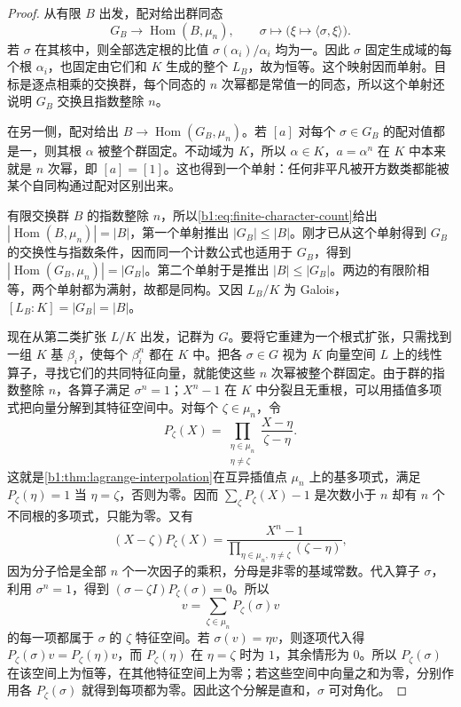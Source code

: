 \begin{proof}
	从有限 \(B\) 出发，配对给出群同态
	\[
		G_B\longrightarrow\operatorname{Hom}(B,\mu_n),\qquad \sigma\longmapsto\bigl(\xi\mapsto\langle\sigma,\xi\rangle\bigr).
	\]
	若 \(\sigma\) 在其核中，则全部选定根的比值 \(\sigma(\alpha_i)/\alpha_i\) 均为一。因此 \(\sigma\) 固定生成域的每个根 \(\alpha_i\)，也固定由它们和 \(K\) 生成的整个 \(L_B\)，故为恒等。这个映射因而单射。目标是逐点相乘的交换群，每个同态的 \(n\) 次幂都是常值一的同态，所以这个单射还说明 \(G_B\) 交换且指数整除 \(n\)。

	在另一侧，配对给出 \(B\rightarrow\operatorname{Hom}(G_B,\mu_n)\)。若 \([a]\) 对每个 \(\sigma\in G_B\) 的配对值都是一，则其根 \(\alpha\) 被整个群固定。不动域为 \(K\)，所以 \(\alpha\in K\)，\(a=\alpha^n\) 在 \(K\) 中本来就是 \(n\) 次幂，即 \([a]=[1]\)。这也得到一个单射：任何非平凡被开方数类都能被某个自同构通过配对区别出来。

	有限交换群 \(B\) 的指数整除 \(n\)，所以\eqref{b1:eq:finite-character-count}给出 \(|\operatorname{Hom}(B,\mu_n)|=|B|\)，第一个单射推出 \(|G_B|\le|B|\)。刚才已从这个单射得到 \(G_B\) 的交换性与指数条件，因而同一个计数公式也适用于 \(G_B\)，得到 \(|\operatorname{Hom}(G_B,\mu_n)|=|G_B|\)。第二个单射于是推出 \(|B|\le|G_B|\)。两边的有限阶相等，两个单射都为满射，故都是同构。又因 \(L_B/K\) 为 Galois，\([L_B:K]=|G_B|=|B|\)。

	现在从第二类扩张 \(L/K\) 出发，记群为 \(G\)。要将它重建为一个根式扩张，只需找到一组 \(K\) 基 \(\beta_i\)，使每个 \(\beta_i^n\) 都在 \(K\) 中。把各 \(\sigma\in G\) 视为 \(K\) 向量空间 \(L\) 上的线性算子，寻找它们的共同特征向量，就能使这些 \(n\) 次幂被整个群固定。由于群的指数整除 \(n\)，各算子满足 \(\sigma^n=1\)；\(X^n-1\) 在 \(K\) 中分裂且无重根，可以用插值多项式把向量分解到其特征空间中。对每个 \(\zeta\in\mu_n\)，令
	\[
		P_\zeta(X)=\prod_{\substack{\eta\in\mu_n\\\eta\neq\zeta}} \frac{X-\eta}{\zeta-\eta}.
	\]
	这就是\cref{b1:thm:lagrange-interpolation}在互异插值点 \(\mu_n\) 上的基多项式，满足 \(P_\zeta(\eta)=1\) 当 \(\eta=\zeta\)，否则为零。因而 \(\sum_\zeta P_\zeta(X)-1\) 是次数小于 \(n\) 却有 \(n\) 个不同根的多项式，只能为零。又有
	\[
		(X-\zeta)P_\zeta(X)= \frac{X^n-1}{\prod_{\eta\in\mu_n,\,\eta\ne\zeta}(\zeta-\eta)},
	\]
	因为分子恰是全部 \(n\) 个一次因子的乘积，分母是非零的基域常数。代入算子 \(\sigma\)，利用 \(\sigma^n=1\)，得到 \((\sigma-\zeta I)P_\zeta(\sigma)=0\)。所以
	\[
		v=\sum_{\zeta\in\mu_n}P_\zeta(\sigma)v
	\]
	的每一项都属于 \(\sigma\) 的 \(\zeta\) 特征空间。若 \(\sigma(v)=\eta v\)，则逐项代入得 \(P_\zeta(\sigma)v=P_\zeta(\eta)v\)，而 \(P_\zeta(\eta)\) 在 \(\eta=\zeta\) 时为 \(1\)，其余情形为 \(0\)。所以 \(P_\zeta(\sigma)\) 在该空间上为恒等，在其他特征空间上为零；若这些空间中向量之和为零，分别作用各 \(P_\zeta(\sigma)\) 就得到每项都为零。因此这个分解是直和，\(\sigma\) 可对角化。


\end{proof}
